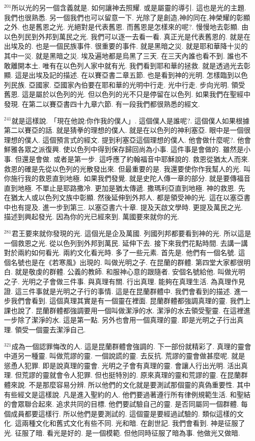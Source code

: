 \documentclass{book}
\begin{document}
$^{201}$所以光的另一個含義就是.
如何讓神去照耀.
或是屬靈的導引.
這也是光的主題.
我們也很熟悉.
另一個我們也可以留意一下.
光除了是創造,神的同在,神榮耀的彰顯之外.
也是舊恩之光.
光絕對是代表舊恩.
而舊恩是怎樣來的呢?.
慢慢地去彰顯.
由以色列民到外邦到萬民之光.
我們可以逐一去看一看.
真正光是代表舊恩的.
就是在出埃及的.
也是一個民族事件.
很重要的事件.
就是黑暗之災.
就是耶和華降十災的其中一災.
就是黑暗之災.
埃及遍地都是烏黑了三天.
在三天內誰也看不到.
誰也不敢離開本土.
唯有在以色列人家中就有光.
我們看到耶和華的拯救.
就是透過光去彰顯.
這是出埃及記的描述.
在以賽亞書二章五節.
也是看到神的光明.
怎樣臨到以色列民族.
亞國家.
亞國家內伯要在耶和華的光明中行走.
光中行走.
步向光明.
領受舊恩.
這是屬於以色列的光.
但以色列的光不只是停留在以色列.
如果我們在聖經中發現.
在第二以賽亞書四十九章六節.
有一段我們都很熟悉的經文.

$^{241}$就是這樣說.
「現在他說:你作我的僕人」.
這個僕人是誰呢?.
這個僕人如果根據第二以賽亞的話.
就是猜拳的理想的僕人.
就是在以色列的神利塞亞.
眼中是一個很理想的僕人.
這個預言式的經文.
提到利塞亞這個理想的僕人.
他會做什麼呢?.
他會鮮雅各眾之派復興.
使以色列中得到保存歸回尚為小事.
這件事是會做的.
雖然是小事.
但還是會做.
或者是第一步.
這呼應了約翰福音中耶穌說的.
救恩從猶太人而來.
救恩的確是先從以色列的光散發出來.
但最重要的是.
我還要使你作我幫人的光.
叫你施行我的救恩直到地極.
如果我們發覺.
就是史陀人傳一章的部分.
就是要傳福音直到地極.
不單止是耶路撒冷.
更加是猶太傳遞.
撒瑪利亞直到地極.
神的救恩.
先在猶太人或以色列文族中彰顯.
然後延伸到外邦人.
都是領受神的光.
這在以塞亞書中也有提及.
進一步到第三.
以塞亞書六十章.
提及天啟文學時.
更提及萬民之光.
描述到興起發光.
因為你的光已經來到.
萬國要來就你的光.

$^{281}$君王要來就你發現的光.
這個光是企及萬國.
列國列邦都要看到神的光.
所以這是一個救恩之光.
從以色列到外邦到萬民.
延伸下去.
接下來我們花點時間.
去講一講對於兩約如何看光.
兩約文化看光時.
多了一些元素.
首先是.
他們有一個名號.
這個名號也是在《若寒風》出現的.
叫做光明之子.
在昆蘭的群體.
第四堂大家都很明白.
就是敬虔的群體.
公義的教師.
和服神心意的跟隨者.
安個名號給他.
叫做光明之子.
光明之子會做三件事.
與真理有關.
行出真理.
能夠在真理生活.
為真理作見證.
這三件事就是光明之子行的事情.
這是在昆蘭群體中.
我們會看到的描述.
進一步我們會看到.
這個真理其實是有一個靈在裡面.
昆蘭群體都強調真理的靈.
我們上課也說了.
昆蘭群體都強調要用一個叫做潔淨的水.
潔淨的水去領受聖靈.
在這裡進一步除了潔淨的水.
這是第一點.
另外也會用一個真理的靈.
即是光明之子行出真理.
領受一個靈去潔淨自己.

$^{321}$成為一個認罪悔改的人.
這是昆蘭群體會強調的.
下一部份就精彩了.
真理的靈會中道另一種靈.
叫做荒謬的靈.
一個說謊的靈.
去反抗.
荒謬的靈會做甚麼呢.
就是慫恿人犯罪.
即是說真理的靈會.
光明之子會有真理的靈.
會讓人行出光明.
活出真理.
但荒謬的靈就會令人犯罪.
但也挺特別的.
原來真理的靈和荒謬的靈.
在昆蘭群體來說.
不是那麼容易分辨.
所以他們的文化就是要測試那個靈的真偽重要性.
其中有些經文是這樣說.
凡是進入聖約的人.
他們要過著遵行所有律例規範生活.
和聖結的會眾聯合起來.
追求共同的目標.
他們要試驗自己的靈.
是否同屬同一個群體.
每個成員都要這樣行.
所以他們是要測試的.
這個靈是要經過試驗的.
類似這樣的文化.
這兩種文化和舊式文化有些不同.
光和暗.
在創世記.
我們會看到.
神是征服了光.
征服了暗.
看光是好的.
是一個模範.
但他同時征服了暗為事.
他做光又做暗.
\end{document}

